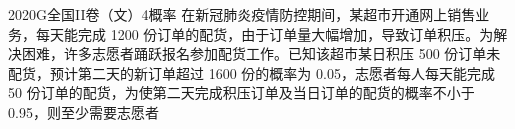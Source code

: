 
\begin{problem}{2020}{G}{全国II卷（文）}{4}{概率}
在新冠肺炎疫情防控期间，某超市开通网上销售业务，每天能完成 1200 份订单的配货，由于订单量大幅增加，导致订单积压。为解决困难，许多志愿者踊跃报名参加配货工作。已知该超市某日积压 500 份订单未配货，预计第二天的新订单超过 1600 份的概率为 0.05，志愿者每人每天能完成 50 份订单的配货，为使第二天完成积压订单及当日订单的配货的概率不小于 0.95，则至少需要志愿者
\begin{choices}
\end{choices}
\end{problem}

\begin{answer}

\end{answer}

\begin{solutions}

\end{solutions}